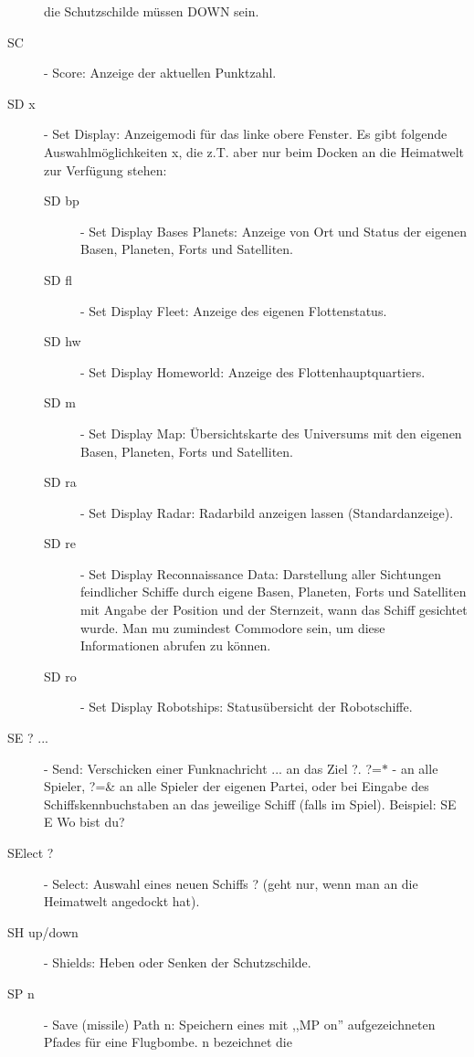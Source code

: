 \begin{description}
        die Schutzschilde m\"ussen DOWN sein.
\item [SC] - Score: Anzeige der aktuellen Punktzahl.
\item [SD x] - Set Display: Anzeigemodi f\"ur das linke obere Fenster. 
               Es gibt folgende Auswahlm\"oglichkeiten x, die z.T. aber nur
               beim Docken an die Heimatwelt zur Verf\"ugung stehen:
      \begin{description}
      \item [SD bp] - Set Display Bases Planets: Anzeige von Ort und Status der
                eigenen Basen, Planeten, Forts und Satelliten.
      \item [SD fl] - Set Display Fleet: Anzeige des eigenen Flottenstatus.
      \item [SD hw] - Set Display Homeworld: Anzeige des Flottenhauptquartiers.
      \item [SD m] - Set Display Map: \"Ubersichtskarte des Universums mit den
                eigenen Basen, Planeten, Forts und Satelliten.
      \item [SD ra] - Set Display Radar: Radarbild anzeigen lassen
                      (Standardanzeige).
      \item [SD re] - Set Display Reconnaissance Data: Darstellung aller 
                Sichtungen
                feindlicher Schiffe durch eigene Basen, Planeten, Forts 
                und Satelliten mit Angabe der Position und der Sternzeit, wann
                das Schiff gesichtet wurde. Man mu\3 zumindest Commodore sein,
                um diese Informationen abrufen zu k\"onnen.
      \item [SD ro] - Set Display Robotships: Status\"ubersicht der Robotschiffe.
      \end{description}
\item [SE ? ...] - Send: Verschicken einer Funknachricht ... an das Ziel ?.
            ?=$\ast$ - an alle Spieler, ?=\& an alle Spieler 
            der eigenen Partei,
            oder bei Eingabe des Schiffskennbuchstaben an das jeweilige
            Schiff (falls im Spiel). Beispiel: SE E Wo bist du?
\item [SElect ?] - Select: Auswahl eines neuen Schiffs ? (geht nur, wenn man
                   an die Heimatwelt angedockt hat).
\item [SH up/down] - Shields: Heben oder Senken der Schutzschilde.
\item [SP n] - Save (missile) Path n: Speichern eines mit ,,MP on'' 
               aufgezeichneten Pfades f\"ur eine Flugbombe. n bezeichnet die 

\end{description}
